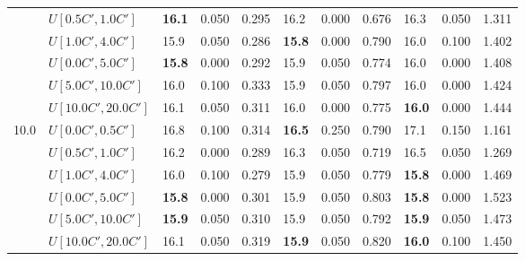 \begin{table}[h]
{\begin{tabular}{|l|l||l|l|l||l|l|l||l|l|l|}
       & $U[0.5C',1.0C']$ & \textbf{16.1} & 0.050 & 0.295 & 16.2 & 0.000 & 0.676 & 16.3 & 0.050 & 1.311 \\
       & $U[1.0C',4.0C']$ & 15.9 & 0.050 & 0.286 & \textbf{15.8} & 0.000 & 0.790 & 16.0 & 0.100 & 1.402 \\
       & $U[0.0C',5.0C']$ & \textbf{15.8} & 0.000 & 0.292 & 15.9 & 0.050 & 0.774 & 16.0 & 0.000 & 1.408 \\
       & $U[5.0C',10.0C']$ & 16.0 & 0.100 & 0.333 & 15.9 & 0.050 & 0.797 & 16.0 & 0.000 & 1.424 \\
       & $U[10.0C',20.0C']$ & 16.1 & 0.050 & 0.311 & 16.0 & 0.000 & 0.775 & \textbf{16.0} & 0.000 & 1.444 \\
      \hline\hline
      \multirow{6}{*}{10.0} & $U[0.0C',0.5C']$ & 16.8 & 0.100 & 0.314 & \textbf{16.5} & 0.250 & 0.790 & 17.1 & 0.150 & 1.161 \\
       & $U[0.5C',1.0C']$ & 16.2 & 0.000 & 0.289 & 16.3 & 0.050 & 0.719 & 16.5 & 0.050 & 1.269 \\
       & $U[1.0C',4.0C']$ & 16.0 & 0.100 & 0.279 & 15.9 & 0.050 & 0.779 & \textbf{15.8} & 0.000 & 1.469 \\
       & $U[0.0C',5.0C']$ & \textbf{15.8} & 0.000 & 0.301 & 15.9 & 0.050 & 0.803 & \textbf{15.8} & 0.000 & 1.523 \\
       & $U[5.0C',10.0C']$ & \textbf{15.9} & 0.050 & 0.310 & 15.9 & 0.050 & 0.792 & \textbf{15.9} & 0.050 & 1.473 \\
       & $U[10.0C',20.0C']$ & 16.1 & 0.050 & 0.319 & \textbf{15.9} & 0.050 & 0.820 & \textbf{16.0} & 0.100 & 1.450 \\
      \hline
      \end{tabular}
      }
      \label{tab:pcpn90p9RecoloredTT}\end{table}

